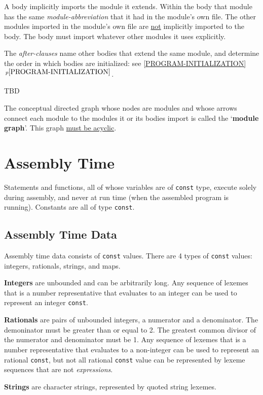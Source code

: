 \documentclass[12pt]{article}
\newcommand{\key}[1]{{\rm \bfseries #1}}
\newcommand{\itemref}[1]{\ref{#1}$\,^{p\pageref{#1}}$}
\begin{document}
A body implicitly imports the module it extends.  Within the
body that module has the same {\em module-abbreviation} that it
had in the module's own file.  The other modules imported in the
module's own file are \underline{not} implicitly imported
to the body.  The body must import whatever other modules it uses
explicitly.

The {\em after-clauses} name other bodies that extend the same
module, and determine the order in which bodies are initialized:
see \itemref{PROGRAM-INITIALIZATION}.

TBD

The conceptual directed graph whose nodes are modules and whose
arrows connect each module to the modules it or its bodies import is called
the `\key{module graph}'.\label{MODULE-GRAPH}
This graph \underline{must be acyclic}.

\section{Assembly Time}

Statements and functions, all of whose variables are of {\tt const}
type, execute solely during assembly, and never at run time
(when the assembled program is running).  Constants are all of
type {\tt const}.

\subsection{Assembly Time Data}

Assembly time data consists of {\tt const} values.
There are 4 types of {\tt const} values: integers, rationals, strings,
and maps.

\key{Integers} are unbounded and can be arbitrarily long.
Any sequence of lexemes that is a
number representative
that evaluates to an integer
can be used to represent an integer {\tt const}.

\key{Rationals} are pairs of unbounded integers, a numerator and a denominator.
The demoninator must be greater than or equal to 2.  The greatest common divisor
of the numerator and denominator must be 1.
Any sequence of lexemes that is a
number representative
that evaluates to a non-integer
can be used to represent an rational {\tt const}, but not all
rational {\tt const} value can be represented by lexeme sequences
that are not {\em expressions}.

\key{Strings} are character strings, represented by quoted string lexemes.
\end{document}
